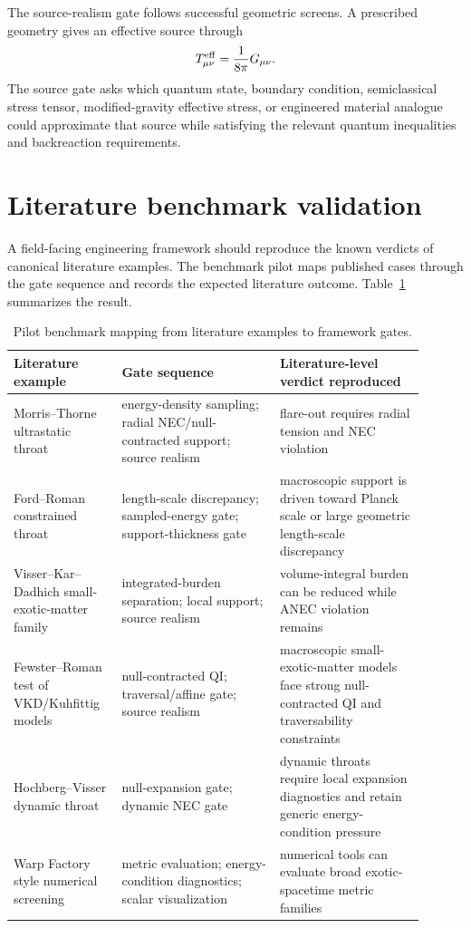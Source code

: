 \documentclass[11pt]{article}
\begin{document}
The source-realism gate follows successful geometric screens.  A prescribed geometry gives an effective source through
\begin{equation}
 T^{\rm eff}_{\mu\nu}=\frac{1}{8\pi}G_{\mu\nu}.
\end{equation}
The source gate asks which quantum state, boundary condition, semiclassical stress tensor, modified-gravity effective stress, or engineered material analogue could approximate that source while satisfying the relevant quantum inequalities and backreaction requirements.

\section{Literature benchmark validation}
\label{sec:benchmarks}

A field-facing engineering framework should reproduce the known verdicts of canonical literature examples.  The benchmark pilot maps published cases through the gate sequence and records the expected literature outcome.  Table~\ref{tab:benchmark} summarizes the result.

\begin{table}[ht]
\centering
\caption{Pilot benchmark mapping from literature examples to framework gates.}
\label{tab:benchmark}
\begin{tabular}{p{0.23\linewidth}p{0.35\linewidth}p{0.32\linewidth}}
\toprule
Literature example & Gate sequence & Literature-level verdict reproduced \\
\midrule
Morris--Thorne ultrastatic throat & energy-density sampling; radial NEC/null-contracted support; source realism & flare-out requires radial tension and NEC violation \citep{morris_thorne_1988} \\
Ford--Roman constrained throat & length-scale discrepancy; sampled-energy gate; support-thickness gate & macroscopic support is driven toward Planck scale or large geometric length-scale discrepancy \citep{ford_roman_1996} \\
Visser--Kar--Dadhich small-exotic-matter family & integrated-burden separation; local support; source realism & volume-integral burden can be reduced while ANEC violation remains \citep{visser_kar_dadhich_2003,kar_dadhich_visser_2004} \\
Fewster--Roman test of VKD/Kuhfittig models & null-contracted QI; traversal/affine gate; source realism & macroscopic small-exotic-matter models face strong null-contracted QI and traversability constraints \citep{fewster_roman_2005} \\
Hochberg--Visser dynamic throat & null-expansion gate; dynamic NEC gate & dynamic throats require local expansion diagnostics and retain generic energy-condition pressure \citep{hochberg_visser_1998} \\
Warp Factory style numerical screening & metric evaluation; energy-condition diagnostics; scalar visualization & numerical tools can evaluate broad exotic-spacetime metric families \citep{helmerich_fuchs_bobrick_2024} \\
\bottomrule
\end{tabular}
\end{table}
\end{document}
